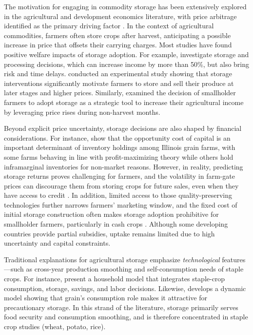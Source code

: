 \noindent The motivation for engaging in commodity storage has been extensively explored in the agricultural and development economics literature, with price arbitrage identified as the primary driving factor \citep{helmberger1977welfare, wright1984welfare, deaton1992behaviour, miranda1996, wright1982econ, minten2014new, nindi2024incentive}. In the context of agricultural commodities, farmers often store crops after harvest, anticipating a possible increase in price that offsets their carrying charges. Most studies have found positive welfare impacts of storage adoption. For example, \cite{ruhinduka2020smallholder} investigate storage and processing decisions, which can increase income by more than 50\%, but also bring risk and time delays. \cite{aggarwal2018grain} conducted an experimental study showing that storage interventions significantly motivate farmers to store and sell their produce at later stages and higher prices. Similarly, \cite{priya2020post} examined the decision of smallholder farmers to adopt storage as a strategic tool to increase their agricultural income by leveraging price rises during non-harvest months.

Beyond explicit price uncertainty, storage decisions are also shaped by financial considerations. For instance, \cite{janzen2024commodity} show that the opportunity cost of capital is an important determinant of inventory holdings among Illinois grain farms, with some farms behaving in line with profit-maximizing theory while others hold inframarginal inventories for non-market reasons. However, in reality, predicting storage returns proves challenging for farmers, and the volatility in farm-gate prices can discourage them from storing crops for future sales, even when they have access to credit \citep{cardell2023price}. In addition, limited access to those quality-preserving technologies further narrows farmers' marketing window, and the fixed cost of initial storage construction often makes storage adoption prohibitive for smallholder farmers, particularly in cash crops \citep{aggarwal2018grain}. Although some developing countries provide partial subsidies, uptake remains limited due to high uncertainty and capital constraints.

Traditional explanations for agricultural storage emphasize \textit{technological} features—such as cross-year production smoothing and self-consumption needs of staple crops. For instance, \cite{saha1994household} present a household model that integrates staple-crop consumption, storage, savings, and labor decisions. Likewise, \cite{park2006risk} develops a dynamic model showing that grain's consumption role makes it attractive for precautionary storage. In this strand of the literature, storage primarily serves food security and consumption smoothing, and is therefore concentrated in staple crop studies (wheat, potato, rice).



